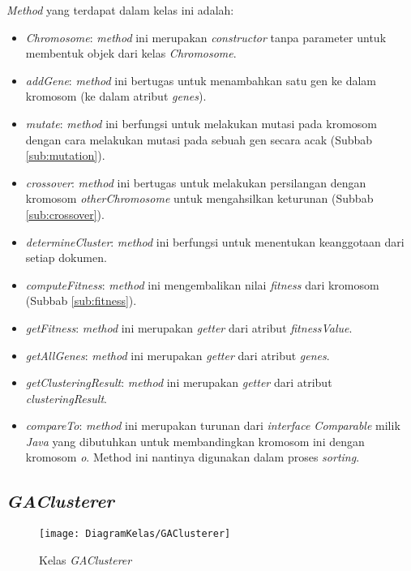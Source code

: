 \textit{Method} yang terdapat dalam kelas ini adalah:

\begin{itemize}
	\item \textit{Chromosome}: \textit{method} ini merupakan \textit{constructor} tanpa parameter untuk membentuk objek dari kelas \textit{Chromosome}.
	\item \textit{addGene}: \textit{method} ini bertugas untuk menambahkan satu gen ke dalam kromosom (ke dalam atribut \textit{genes}).
	\item \textit{mutate}: \textit{method} ini berfungsi untuk melakukan mutasi pada kromosom dengan cara melakukan mutasi pada sebuah gen secara acak (Subbab \ref{sub:mutation}).
	\item \textit{crossover}: \textit{method} ini bertugas untuk melakukan persilangan dengan kromosom \textit{otherChromosome} untuk mengahsilkan keturunan (Subbab \ref{sub:crossover}).
	\item \textit{determineCluster}: \textit{method} ini berfungsi untuk menentukan keanggotaan dari setiap dokumen.
	\item \textit{computeFitness}: \textit{method} ini mengembalikan nilai \textit{fitness} dari kromosom (Subbab \ref{sub:fitness}).
	\item \textit{getFitness}: \textit{method} ini merupakan \textit{getter} dari atribut \textit{fitnessValue}.
	\item \textit{getAllGenes}: \textit{method} ini merupakan \textit{getter} dari atribut \textit{genes}.
	\item \textit{getClusteringResult}: \textit{method} ini merupakan \textit{getter} dari atribut \textit{clusteringResult}.
	\item \textit{compareTo}: \textit{method} ini merupakan turunan dari \textit{interface Comparable} milik \textit{Java} yang dibutuhkan untuk membandingkan kromosom ini dengan kromosom \textit{o}. Method ini nantinya digunakan dalam proses \textit{sorting}.
\end{itemize}

\subsection{\textit{GAClusterer}}

\begin{figure}[H]
	\begin{center}
		\texttt{[image: DiagramKelas/GAClusterer]}
		\caption{Kelas \textit{GAClusterer}}
		\label{fig:kelasGAClusterer}
	\end{center}
\end{figure}

